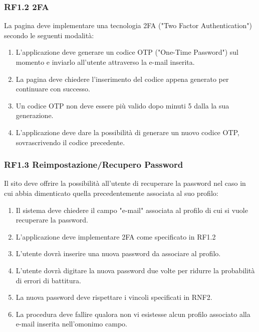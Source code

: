 \documentclass{report}
\begin{document}
	\subsubsection{RF1.2 2FA}
	La pagina deve implementare una tecnologia 2FA ("Two Factor Authentication") secondo le seguenti modalità:
	
	\begin{enumerate}
	\item L'applicazione deve generare un codice OTP ("One-Time Password") sul momento e inviarlo all'utente attraverso la e-mail inserita.
	
	\item 	La pagina deve chiedere l'inserimento del codice appena generato per continuare con successo.
	
	\item Un codice OTP non deve essere più valido dopo minuti 5 dalla la sua generazione.
	
	\item L'applicazione deve dare la possibilità di generare un nuovo codice OTP, sovrascrivendo il codice precedente.

	\end{enumerate}
	
	\subsubsection*{RF1.3 Reimpostazione/Recupero Password}
	Il sito deve offrire la possibilità all'utente di recuperare la password nel caso in cui abbia dimenticato quella precedentemente associata al suo profilo:
	\begin{enumerate}
			
	\item Il sistema deve chiedere il campo "e-mail" associata al profilo di cui si vuole recuperare la password.
	\item L'applicazione deve implementare 2FA come specificato in RF1.2
	\item L'utente dovrà inserire una nuova password da associare al profilo.
	\item L'utente dovrà digitare la nuova password due volte per ridurre la probabilità di errori di battitura.
	\item La nuova password deve rispettare i vincoli specificati in RNF2.
	\item La procedura deve fallire qualora non vi esistesse alcun profilo associato alla e-mail inserita nell'omonimo campo.

	\end{enumerate}
\end{document}
